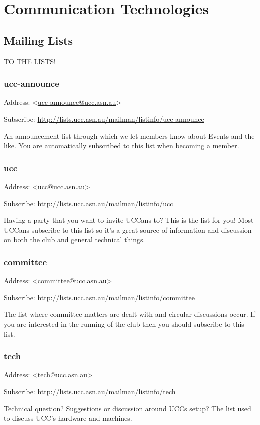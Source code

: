 \chapter{Communication Technologies}\label{Communications}


\newenvironment{ucclist}[1]
{
	\begin{mdframed}
	\subsection{#1}
	\begin{mdframed}
		Address:  <\href{mailto:#1@ucc.asn.au}{#1@ucc.asn.au}>
	\end{mdframed}
	\begin{mdframed}
		Subscribe:  \url{http://lists.ucc.asn.au/mailman/listinfo/#1}
	\end{mdframed}


	
}{\end{mdframed}}

\section{Mailing Lists}

\textsc{TO THE LISTS!}
\begin{ucclist}{ucc-announce}

An announcement list through which we let 
members know about Events and the like. You are automatically 
subscribed to this list when becoming a member. 

\end{ucclist}

\begin{ucclist}{ucc}

Having a party that you want to invite UCCans to? This is the 
list for you! Most UCCans subscribe to this list so it's a great 
source of information and discussion on both the club and general 
technical things. 

\end{ucclist}

\begin{ucclist}{committee}
The list where committee matters are dealt with and circular 
discussions occur. If you are interested in the running of the club then 
you should subscribe to this list. 
\end{ucclist}

\begin{ucclist}{tech}
Technical question? Suggestions or discussion around UCCs setup? 
The list used to discuss UCC's hardware and machines. 
\end{ucclist}

